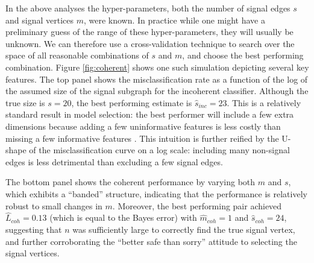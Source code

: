 \documentclass[10pt,journal,cspaper,compsoc]{IEEEtran}
\providecommand{\wh}[1]{\widehat{#1}}
\begin{document}
In the above analyses the hyper-parameters, both the number of signal edges $s$ and signal vertices $m$, were known.  In practice while one might have a preliminary guess of the range of these hyper-parameters, they will usually be unknown.  We can therefore use a cross-validation technique to search over the space of all reasonable combinations of $s$ and $m$, and choose the best performing combination.  Figure \ref{fig:coherent} shows one such simulation depicting several key features.  The top panel shows the misclassification rate as a function of the log of the assumed size of the signal subgraph for the incoherent classifier.  Although the true size is $s=20$, the best performing estimate is $\wh{s}_{inc}=23$. This is a relatively standard result in model selection: the best performer will include a few extra dimensions because adding a few uninformative features is less costly than missing a few informative features \cite{Jain2000}.  This intuition is further reified by the U-shape of the misclassification curve on a log scale: including many non-signal edges is less detrimental than excluding a few signal edges.

The bottom panel shows the coherent performance by varying both $m$ and $s$, which exhibits a ``banded''  structure, indicating that the performance is relatively robust to small changes in $m$.  Moreover, the best performing pair achieved $\wh{L}_{coh}=0.13$ (which is equal to the Bayes error) with $\wh{m}_{coh}=1$ and $\wh{s}_{coh}=24$, suggesting that $n$ was sufficiently large to correctly find the true signal vertex, and further corroborating the ``better safe than sorry'' attitude to selecting the signal vertices. 
\end{document}
